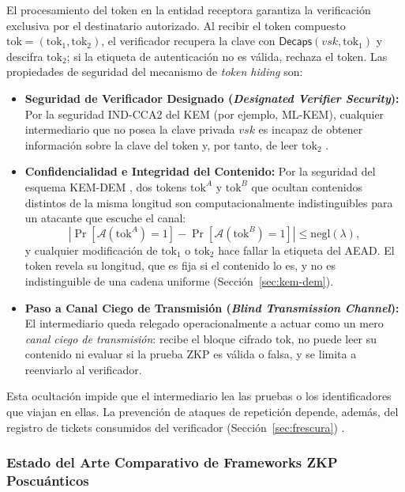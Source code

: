 El procesamiento del token en la entidad receptora garantiza la verificación exclusiva por el destinatario autorizado. Al recibir el token compuesto $\text{tok} = (\text{tok}_1, \text{tok}_2)$, el verificador recupera la clave con $\mathsf{Decaps}(vsk, \text{tok}_1)$ y descifra $\text{tok}_2$; si la etiqueta de autenticación no es válida, rechaza el token. Las propiedades de seguridad del mecanismo de \textit{token hiding} son:

\begin{itemize}
    \item \textbf{Seguridad de Verificador Designado (\textit{Designated Verifier Security}):} Por la seguridad IND-CCA2 del KEM (por ejemplo, ML-KEM), cualquier intermediario que no posea la clave privada $vsk$ es incapaz de obtener información sobre la clave del token y, por tanto, de leer $\text{tok}_2$ \cite{nist2024fips203}.

    \item \textbf{Confidencialidad e Integridad del Contenido:} Por la seguridad del esquema KEM-DEM \cite{cramer2003design}, dos tokens $\text{tok}^{A}$ y $\text{tok}^{B}$ que ocultan contenidos distintos de la misma longitud son computacionalmente indistinguibles para un atacante que escuche el canal:
    \begin{equation}
    \left| \Pr[\mathcal{A}(\text{tok}^{A}) = 1] - \Pr[\mathcal{A}(\text{tok}^{B}) = 1] \right| \le \mathrm{negl}(\lambda),
    \end{equation}
    y cualquier modificación de $\text{tok}_1$ o $\text{tok}_2$ hace fallar la etiqueta del AEAD. El token revela su longitud, que es fija si el contenido lo es, y no es indistinguible de una cadena uniforme (Sección~\ref{sec:kem-dem}).

    \item \textbf{Paso a Canal Ciego de Transmisión (\textit{Blind Transmission Channel}):} El intermediario queda relegado operacionalmente a actuar como un mero \textit{canal ciego de transmisión}: recibe el bloque cifrado $\text{tok}$, no puede leer su contenido ni evaluar si la prueba ZKP es válida o falsa, y se limita a reenviarlo al verificador.
\end{itemize}

Esta ocultación impide que el intermediario lea las pruebas o los identificadores que viajan en ellas. La prevención de ataques de repetición depende, además, del registro de tickets consumidos del verificador (Sección~\ref{sec:frescura}) \cite{ma2026laasso}.


\subsubsection{Estado del Arte Comparativo de Frameworks ZKP Poscuánticos}

